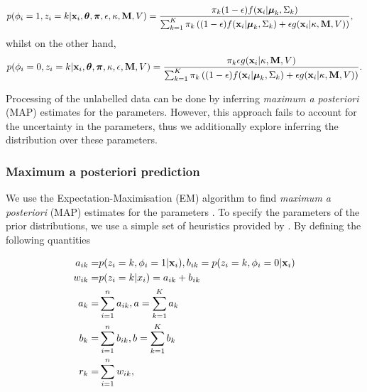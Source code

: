 \documentclass[10pt,letterpaper]{article}\usepackage[]{graphicx}\usepackage[]{color}
\begin{document}
\begin{equation}\label{equation::estep1}
\begin{split}
p(\phi_i = 1, z_i = k|{\bf x}_i, \boldsymbol{\theta}, \boldsymbol{\pi} , \epsilon,\kappa, {\bf M}, V)  & = \frac{\pi_k(1-\epsilon)f({\bf x}_i|\boldsymbol{\mu}_k, \Sigma_{k})}{\sum_{k=1}^{K}\pi_k\left((1-\epsilon) f({\bf x}_i|\boldsymbol{\mu}_k, \Sigma_k) + \epsilon g({\bf x}_i|\kappa, {\bf M}, V)\right)},
\end{split}
\end{equation}
whilst on the other hand,
\begin{equation}\label{equation::estep2}
\begin{split}
p(\phi_i = 0, z_i = k|{\bf x}_i, \boldsymbol{\theta}, \boldsymbol{\pi},\kappa, \epsilon, {\bf M}, V)  = \frac{\pi_k \epsilon g({\bf x}_i|\kappa, {\bf M}, V)}{\sum_{k=1}^{K}\pi_k\left((1-\epsilon) f({\bf x}_i|\boldsymbol{\mu}_k, \Sigma_k) + \epsilon g({\bf x}_i|\kappa, {\bf M}, V)\right)}.
\end{split}
\end{equation}

Processing of the unlabelled data can be done by inferring {\em maximum
  a posteriori} (MAP) estimates for the parameters. However, this
approach fails to account for the uncertainty in the parameters, thus
we additionally explore inferring the distribution over these
parameters.

\subsubsection*{Maximum a posteriori prediction}

We use the Expectation-Maximisation (EM) algorithm \cite{EM:1977} to
find {\em maximum a posteriori} (MAP) estimates for the parameters
\cite[see, for example,][]{Murphy:2012}. To specify the parameters of
the prior distributions, we use a simple set of heuristics provided by
\cite{Fraley:2007}. By defining the following quantities

\begin{equation}\label{equation::estepfinal}
\begin{split}
a_{ik} = & p(z_i = k, \phi_i = 1|{\bf x}_i), b_{ik} = p(z_i = k, \phi_i = 0|{\bf x}_i) \\
w_{ik} = & p(z_i = k|x_i) = a_{ik} + b_{ik}\\
a_k = & \sum_{i=1}^{n}a_{ik}, a = \sum_{k=1}^{K}a_k \\
b_k = & \sum_{i=1}^{n}b_{ik}, b = \sum_{k=1}^{K}b_k \\
r_k = & \sum_{i=1}^{n}w_{ik},
\end{split}
\end{equation}
\end{document}
